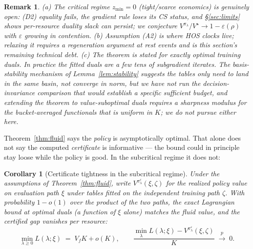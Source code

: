 \documentclass[11pt]{article}
\newtheorem{remark}{Remark}
\newtheorem{corollary}{Corollary}
\newcommand{\Vstar}{V^{\star}}
\newcommand{\pol}{\pi_{\lambda}}
\begin{document}
\begin{remark}
(a) The critical regime $z_{\min} = 0$ (tight/scarce economics) is
genuinely open: (D2) equality fails, the gradient rule loses its CS
status, and \S\ref{sec:limits} shows per-resource duality slack can
persist; we conjecture $V^{\pol}/\Vstar \to 1 - \varepsilon(\rho)$ with
$\varepsilon$ growing in contention. (b) Assumption (A2) is where HOS
clocks live; relaxing it requires a regeneration argument at rest events
and is this section's remaining technical debt. (c) The theorem is
stated for exactly optimal training duals. In practice the fitted
duals are a few tens of subgradient iterates. The basis-stability
mechanism of Lemma~\ref{lem:stability} suggests the tables only need
to land in the same basin, not converge in norm, but we have not run
the decision-invariance comparison that would establish a specific
sufficient budget, and extending the theorem to value-suboptimal
duals requires a sharpness modulus for the bucket-averaged functionals
that is uniform in $K$; we do not pursue either here.
\end{remark}

Theorem~\ref{thm:fluid} says the \emph{policy} is asymptotically
optimal. That alone does not say the computed \emph{certificate} is
informative --- the bound could in principle stay loose while the
policy is good. In the subcritical regime it does not:

\begin{corollary}[Certificate tightness in the subcritical regime]
\label{cor:tight}
Under the assumptions of Theorem~\ref{thm:fluid}, write
$V^{\pol^{\varepsilon}}(\xi, \zeta)$ for the realized policy value on
evaluation path $\xi$ under tables fitted on the independent training
path $\zeta$. With probability $1 - o(1)$ over the product of the two
paths, the exact Lagrangian bound at optimal duals (a function of
$\xi$ alone) matches the fluid value, and the certified gap vanishes
per resource:
\begin{equation}
  \min_{\lambda \geq 0} L(\lambda; \xi) \;=\; V_f K + o(K),
  \qquad
  \frac{\min_{\lambda} L(\lambda; \xi)
  - V^{\pol^{\varepsilon}}(\xi, \zeta)}{K}
  \;\xrightarrow{\;p\;}\; 0.
\end{equation}
\end{corollary}
\end{document}
